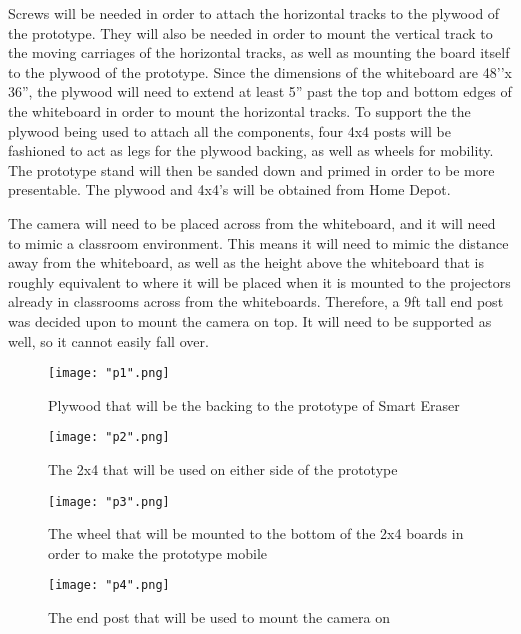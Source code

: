 \setlength{\parindent}{2.5ex}Screws will be needed in order to attach the horizontal tracks to the plywood of the prototype. They will also be needed in order to mount the vertical track to the moving carriages of the horizontal tracks, as well as mounting the board itself to the plywood of the prototype. Since the dimensions of the whiteboard are 48’’x 36”, the plywood will need to extend at least 5” past the top and bottom edges of the whiteboard in order to mount the horizontal tracks.  To support the the plywood being used to attach all the components, four 4x4 posts will be fashioned to act as legs for the plywood backing, as well as wheels for mobility. The prototype stand will then be sanded down and primed in order to be more presentable. The plywood and 4x4’s will be obtained from Home Depot.\par

\setlength{\parindent}{2.5ex}The camera will need to be placed across from the whiteboard, and it will need to mimic a classroom environment. This means it will need to mimic the distance away from the whiteboard, as well as the height above the whiteboard that is roughly equivalent to where it will be placed when it is mounted to the projectors already in classrooms across from the whiteboards. Therefore, a 9ft tall end post was decided upon to mount the camera on top. It will need to be supported as well, so it cannot easily fall over.

\begin{figure}[H]
	\centering
	{\texttt{[image: "p1".png]}}
	\caption{  Plywood that will be the backing to the prototype of Smart Eraser
		\cite{smdataR}}
	\label{fig:p1}
\end{figure}

\begin{figure}[H]
	\centering
	{\texttt{[image: "p2".png]}}
	\caption{  The 2x4 that will be used on either side of the prototype
		\cite{smdataR}}
	\label{fig:p2}
\end{figure}

\begin{figure}[H]
	\centering
	{\texttt{[image: "p3".png]}}
	\caption{  The wheel that will be mounted to the bottom of the 2x4 boards in order to make the prototype mobile
		\cite{smdataR}}
	\label{fig:p3}
\end{figure}

\begin{figure}[H]
	\centering
	{\texttt{[image: "p4".png]}}
	\caption{ The end post that will be used to mount the camera on
		\cite{smdataR}}
	\label{fig:p4}
\end{figure}

